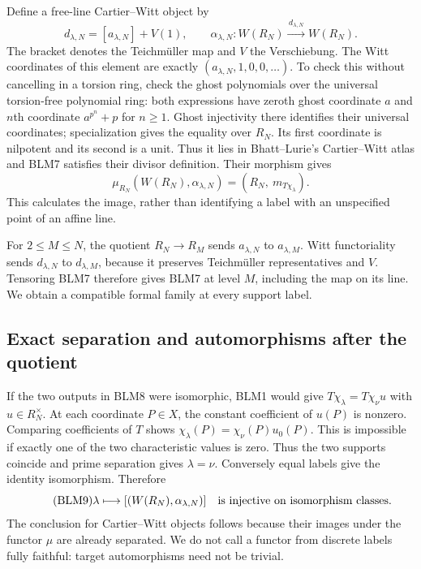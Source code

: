 Define a free-line Cartier--Witt object by
\begin{equation}\tag{BLM7}
d_{\lambda,N}=[a_{\lambda,N}]+V(1),\qquad
\alpha_{\lambda,N}:W(R_N)\xrightarrow{\,d_{\lambda,N}\,}W(R_N).
\end{equation}
The bracket denotes the Teichm\"uller map and $V$ the Verschiebung.
The Witt coordinates of this element are exactly
$(a_{\lambda,N},1,0,0,\ldots)$. To check this without cancelling
in a torsion ring, check the ghost polynomials over the universal
torsion-free polynomial ring: both expressions have zeroth ghost
coordinate $a$ and $n$th coordinate $a^{p^n}+p$ for $n\ge1$.
Ghost injectivity there identifies their universal coordinates;
specialization gives the equality over $R_N$.
Its first coordinate is nilpotent and its second is a unit.
Thus it lies in Bhatt--Lurie's Cartier--Witt atlas and BLM7
satisfies their divisor definition. Their morphism gives
\begin{equation}\tag{BLM8}
\mu_{R_N}(W(R_N),\alpha_{\lambda,N})
=(R_N,\ m_{T\chi_\lambda}).
\end{equation}
This calculates the image, rather than identifying a label with
an unspecified point of an affine line.

For $2\le M\le N$, the quotient $R_N\to R_M$ sends
$a_{\lambda,N}$ to $a_{\lambda,M}$. Witt functoriality sends
$d_{\lambda,N}$ to $d_{\lambda,M}$, because it preserves
Teichm\"uller representatives and $V$. Tensoring BLM7 therefore
gives BLM7 at level $M$, including the map on its line. We obtain
a compatible formal family at every support label.

\subsection{Exact separation and automorphisms after the quotient}
If the two outputs in BLM8 were isomorphic, BLM1 would give
$T\chi_\lambda=T\chi_\nu u$ with $u\in R_N^\times$.
At each coordinate $P\in X$, the constant coefficient of $u(P)$
is nonzero. Comparing coefficients of $T$ shows
$\chi_\lambda(P)=\chi_\nu(P)u_0(P)$. This is impossible if
exactly one of the two characteristic values is zero. Thus the
two supports coincide and prime separation gives $\lambda=\nu$.
Conversely equal labels give the identity isomorphism. Therefore
\begin{equation}\tag{BLM9}
\lambda\longmapsto[(W(R_N),\alpha_{\lambda,N})]
\quad\hbox{is injective on isomorphism classes.}
\end{equation}
The conclusion for Cartier--Witt objects follows because their
images under the functor $\mu$ are already separated. We do not
call a functor from discrete labels fully faithful: target
automorphisms need not be trivial.

